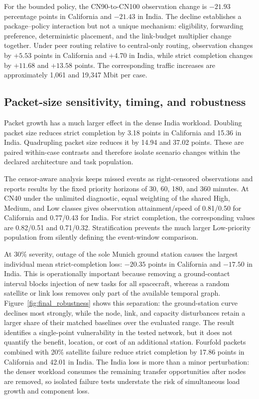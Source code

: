 For the bounded policy, the CN90-to-CN100 observation change is $-21.93$ percentage points in California and $-21.43$ in India. The decline establishes a package--policy interaction but not a unique mechanism: eligibility, forwarding preference, deterministic placement, and the link-budget multiplier change together. Under peer routing relative to central-only routing, observation changes by $+5.53$ points in California and $+4.70$ in India, while strict completion changes by $+11.68$ and $+13.58$ points. The corresponding traffic increases are approximately 1,061 and 19,347 Mbit per case.

\subsection{Packet-size sensitivity, timing, and robustness}

Packet growth has a much larger effect in the dense India workload. Doubling packet size reduces strict completion by 3.18 points in California and 15.36 in India. Quadrupling packet size reduces it by 14.94 and 37.02 points. These are paired within-case contrasts and therefore isolate scenario changes within the declared architecture and task population.

The censor-aware analysis keeps missed events as right-censored observations and reports results by the fixed priority horizons of 30, 60, 180, and 360 minutes. At CN40 under the unlimited diagnostic, equal weighting of the shared High, Medium, and Low classes gives observation attainment/speed of 0.81/0.50 for California and 0.77/0.43 for India. For strict completion, the corresponding values are 0.82/0.51 and 0.71/0.32. Stratification prevents the much larger Low-priority population from silently defining the event-window comparison.

At 30\% severity, outage of the sole Munich ground station causes the largest individual mean strict-completion loss: $-20.35$ points in California and $-17.50$ in India. This is operationally important because removing a ground-contact interval blocks injection of new tasks for all spacecraft, whereas a random satellite or link loss removes only part of the available temporal graph. Figure~\ref{fig:final_robustness} shows this separation: the ground-station curve declines most strongly, while the node, link, and capacity disturbances retain a larger share of their matched baselines over the evaluated range. The result identifies a single-point vulnerability in the tested network, but it does not quantify the benefit, location, or cost of an additional station. Fourfold packets combined with 20\% satellite failure reduce strict completion by 17.86 points in California and 42.01 in India. The India loss is more than a minor perturbation: the denser workload consumes the remaining transfer opportunities after nodes are removed, so isolated failure tests understate the risk of simultaneous load growth and component loss.

